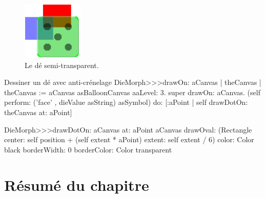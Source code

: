 \documentclass[a4paper,10pt,twoside]{book}
\begin{document}
\begin{figure}[ht]
	\centerline{\includegraphics[scale=0.7]{multiMorphs}}
	\caption{Le dé semi-transparent.\label{fig:multiMorphs}}
\end{figure}

\begin{methods}[aadie]{Dessiner un dé avec anti-crénelage}
DieMorph>>>drawOn: aCanvas
	| theCanvas |
	theCanvas := aCanvas asBalloonCanvas aaLevel: 3.
	super drawOn: aCanvas.
	(self perform: ('face' , dieValue asString) asSymbol)
		do: [:aPoint | self drawDotOn: theCanvas at: aPoint]

DieMorph>>>drawDotOn: aCanvas at: aPoint
	aCanvas
		drawOval: (Rectangle
			center: self position + (self extent * aPoint)
			extent: self extent / 6)
		color: Color black
		borderWidth: 0
		borderColor: Color transparent
\end{methods}

\section{Résumé du chapitre}
\end{document}
